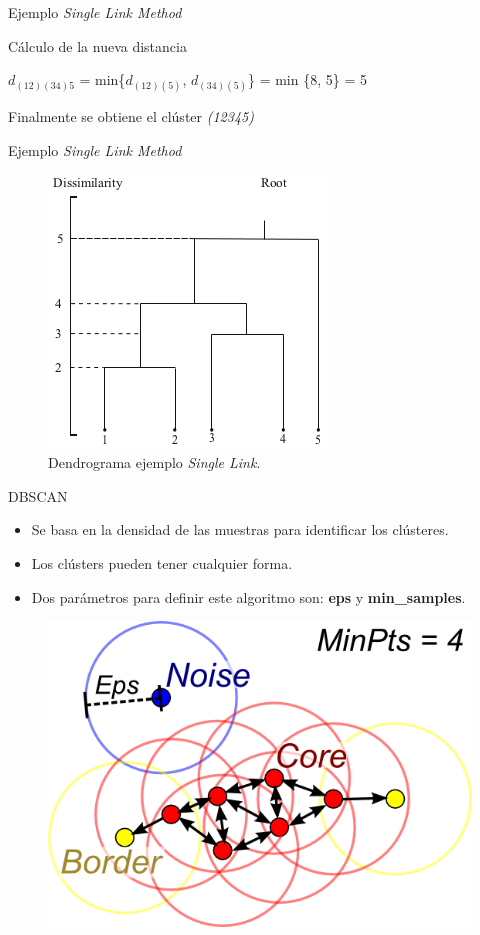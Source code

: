 \documentclass[spanish]{beamer}
\begin{document}
\begin{frame}{Ejemplo \textit{Single Link Method}}

	Cálculo de la nueva distancia
	\begin{center}
	$d_{(12)(34)5}$ = min\{$d_{(12)(5)}$, $d_{(34)(5)}$\} = min \{8, 5\} = 5
	\end{center}
	Finalmente se obtiene el clúster \textit{(12345)}
\end{frame}

\begin{frame}{Ejemplo \textit{Single Link Method}}
	\begin{figure}[H]
		\centering
		\includegraphics[scale=0.56]{victoria/agloEjem}
		\caption{Dendrograma ejemplo \textit{Single Link}.}
		\label{fig:agloEjem}
	\end{figure}
\end{frame}

\begin{frame}{DBSCAN}
\begin{itemize}
\item Se basa en la densidad de las muestras para identificar los clústeres.
\item Los clústers pueden tener cualquier forma.
\item Dos parámetros para definir este algoritmo son: \textbf{eps} y \textbf{min\_samples}.
\end{itemize}
\begin{figure}[h]
\centering
\includegraphics[scale=1.2]{dani/DBSCAN.png}
\end{figure}
\end{frame}
\end{document}
